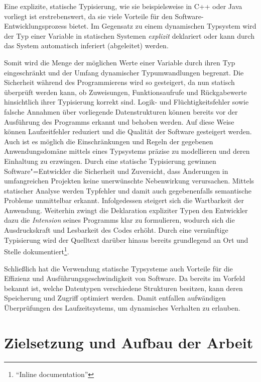 Eine explizite, statische Typisierung, wie sie beispielsweise in C++ oder Java vorliegt ist erstrebenswert, da sie viele Vorteile für den Software-Entwicklungsprozess bietet. Im Gegensatz zu einem dynamischen Typsystem wird der Typ einer Variable in statischen Systemen \emph{explizit} deklariert oder kann durch das System automatisch inferiert (abgeleitet) werden.

Somit wird die Menge der möglichen Werte einer Variable durch ihren Typ eingeschränkt und der Umfang dynamischer Typumwandlungen begrenzt.
Die Sicherheit während des Programmierens wird so gesteigert, da nun statisch überprüft werden kann, ob Zuweisungen, Funktionsaufrufe und Rückgabewerte hinsichtlich ihrer Typisierung korrekt sind. Logik- und Flüchtigkeitsfehler sowie falsche Annahmen über vorliegende Datenstrukturen können bereits vor der Ausführung des Programms erkannt und behoben werden. Auf diese Weise können Laufzeitfehler reduziert und die Qualität der Software gesteigert werden. Auch ist es möglich die Einschränkungen und Regeln der gegebenen Anwendungsdomäne mittels eines Typsystems präzise zu modellieren und deren Einhaltung zu erzwingen. Durch eine statische Typisierung gewinnen Software"=Entwickler die Sicherheit und Zuversicht, dass Änderungen in umfangreichen Projekten keine unerwünschte Nebenwirkung verursachen. Mittels statischer Analyse werden Typfehler und damit auch gegebenenfalls semantische Probleme unmittelbar erkannt. Infolgedessen steigert sich die Wartbarkeit der Anwendung. Weiterhin zwingt die Deklaration expliziter Typen den Entwickler dazu die \emph{Intension} seines Programms klar zu formulieren, wodurch sich die Ausdruckskraft und Lesbarkeit des Codes erhöht. Durch eine vernünftige Typisierung wird der Quelltext darüber hinaus bereits grundlegend an Ort und Stelle dokumentiert\footnote{\enquote{Inline documentation}}.

Schließlich hat die Verwendung statische Typsysteme auch Vorteile für die Effizienz und Ausführungsgeschwindigkeit von Software. Da bereits im Vorfeld bekannt ist, welche Datentypen verschiedene Strukturen besitzen, kann deren Speicherung und Zugriff optimiert werden. Damit entfallen aufwändigen Überprüfungen des Laufzeitsystems, um dynamisches Verhalten zu erlauben.

\section{Zielsetzung und Aufbau der Arbeit}

